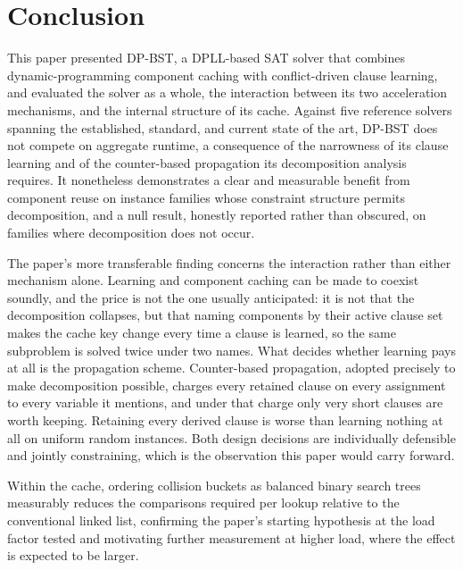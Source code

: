 \documentclass[conference]{IEEEtran}
\begin{document}
\section{Conclusion}

This paper presented DP-BST, a DPLL-based SAT solver that combines dynamic-programming component
caching with conflict-driven clause learning, and evaluated the solver as a whole, the interaction
between its two acceleration mechanisms, and the internal structure of its cache. Against five
reference solvers spanning the established, standard, and current state of the art, DP-BST does
not compete on aggregate runtime, a consequence of the narrowness of its clause learning and of
the counter-based propagation its decomposition analysis requires. It nonetheless demonstrates a
clear and measurable benefit from component reuse on instance families whose constraint structure
permits decomposition, and a null result, honestly reported rather than obscured, on families
where decomposition does not occur.

The paper's more transferable finding concerns the interaction rather than either mechanism
alone. Learning and component caching can be made to coexist soundly, and the price is not the
one usually anticipated: it is not that the decomposition collapses, but that naming components by
their active clause set makes the cache key change every time a clause is learned, so the same
subproblem is solved twice under two names. What decides whether learning pays at all is the
propagation scheme. Counter-based propagation, adopted precisely to make decomposition possible,
charges every retained clause on every assignment to every variable it mentions, and under that
charge only very short clauses are worth keeping. Retaining every derived clause is worse than
learning nothing at all on uniform random instances. Both design decisions are individually
defensible and jointly constraining, which is the observation this paper would carry forward.

Within the cache, ordering collision buckets as balanced binary search trees measurably reduces
the comparisons required per lookup relative to the conventional linked list, confirming the
paper's starting hypothesis at the load factor tested and motivating further measurement at higher
load, where the effect is expected to be larger.
\end{document}
